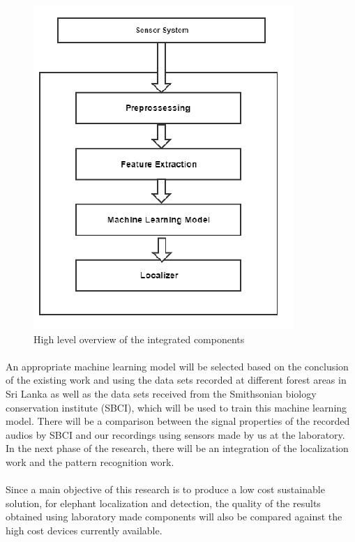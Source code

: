 \documentclass[11pt]{article}
\numberwithin{figure}{section}
\numberwithin{table}{section}
\begin{document}
\begin{figure}[h]
\centering
\includegraphics{flow.png}
\caption{High level overview of the integrated components}
\label{d:H}
\end{figure}

\paragraph{}
An appropriate machine learning model will be selected based on the conclusion of the existing work and using the data sets recorded at different forest areas in Sri Lanka as well as the data sets received from the Smithsonian biology conservation institute (SBCI), which will be used to train this machine learning model. There will be a comparison between the signal properties of the recorded audios by SBCI and our recordings using sensors made by us at the laboratory. In the next phase of the research, there will be an integration of the localization work and the pattern recognition work.

\paragraph{}
Since a main objective of this research is to produce a low cost sustainable solution, for elephant localization and detection, the quality of the results obtained using laboratory made components will also be compared against the high cost devices currently available.
\end{document}
